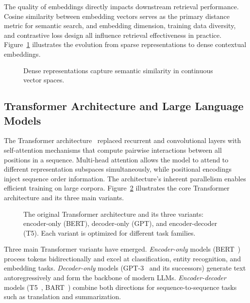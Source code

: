 The quality of embeddings directly impacts downstream retrieval performance. Cosine similarity between embedding vectors serves as the primary distance metric for semantic search, and embedding dimension, training data diversity, and contrastive loss design all influence retrieval effectiveness in practice. Figure~\ref{fig:embeddings} illustrates the evolution from sparse representations to dense contextual embeddings.

\begin{figure}[htbp]
\centering
{}
\caption{Dense representations capture semantic similarity in continuous vector spaces.}
\label{fig:embeddings}
\end{figure}

\subsection{Transformer Architecture and Large Language Models}
\label{sec:rw:transformers}

The Transformer architecture~\cite{vaswani2017attentionisallyouneed} replaced recurrent and convolutional layers with self-attention mechanisms that compute pairwise interactions between all positions in a sequence. Multi-head attention allows the model to attend to different representation subspaces simultaneously, while positional encodings inject sequence order information. The architecture's inherent parallelism enables efficient training on large corpora. Figure~\ref{fig:transformers} illustrates the core Transformer architecture and its three main variants.

\begin{figure}[htbp]
\centering
{}
\caption{The original Transformer architecture and its three variants: encoder-only (BERT), decoder-only (GPT), and encoder-decoder (T5). Each variant is optimized for different task families.}
\label{fig:transformers}
\end{figure}

Three main Transformer variants have emerged. \emph{Encoder-only} models (BERT~\cite{devlin2019bertpretrainingdeepbidirectional}) process tokens bidirectionally and excel at classification, entity recognition, and embedding tasks. \emph{Decoder-only} models (GPT-3~\cite{brown2020languagemodelsarefewshotlearners} and its successors) generate text autoregressively and form the backbone of modern LLMs. \emph{Encoder-decoder} models (T5~\cite{raffel2020exploring}, BART~\cite{lewis2020bart}) combine both directions for sequence-to-sequence tasks such as translation and summarization.

